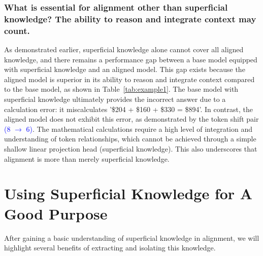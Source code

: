 \subsubsection{What is essential for alignment other than superficial knowledge? The ability to reason and integrate context may count.} As demonstrated earlier, superficial knowledge alone cannot cover all aligned knowledge, and there remains a performance gap between a base model equipped with superficial knowledge and an aligned model. This gap exists because the aligned model is superior in its ability to reason and integrate context compared to the base model, as shown in Table~\ref{tab:example1}. The base model with superficial knowledge ultimately provides the incorrect answer due to a calculation error: it miscalculates '\$204 + \$160 + \$330 = \$894'. In contrast, the aligned model does not exhibit this error, as demonstrated by the token shift pair \textcolor{blue}{(8 $\rightarrow$ 6)}.  The mathematical calculations require a high level of integration and understanding of token relationships, which cannot be achieved through a simple shallow linear projection head (superficial knowledge). This also underscores that alignment is more than merely superficial knowledge.

















\section{Using Superficial Knowledge for A Good Purpose}
\label{sec:good_purpose}

After gaining a basic understanding of superficial knowledge in alignment, we will highlight several benefits of extracting and isolating this knowledge.


